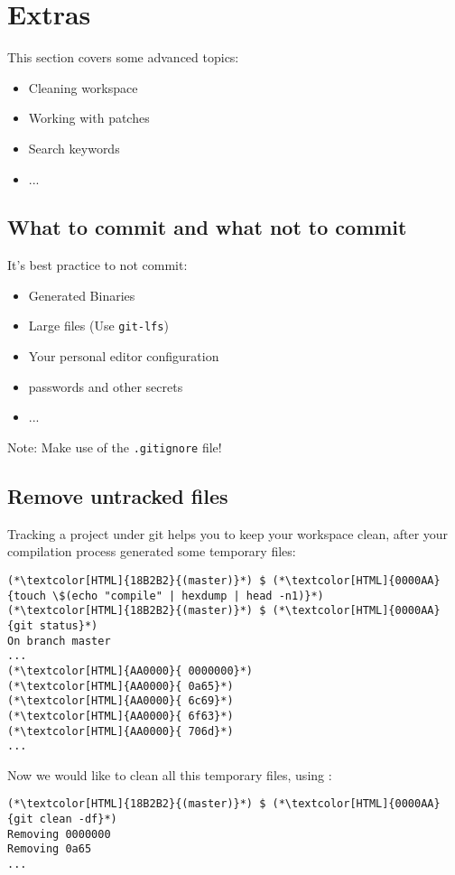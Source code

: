 \section{Extras}
\begin{frame}[fragile]
  \slidetitle
  This section covers some advanced topics:
  \begin{itemize}
    \item Cleaning workspace
    \item Working with patches
    \item Search keywords
    \item ...
  \end{itemize}
\end{frame}

\subsection{What to commit and what not to commit}
\begin{frame}[fragile]
  \slidetitle
  It's best practice to not commit:
  \begin{itemize}
    \item Generated Binaries
    \item Large files (Use \lstinline{git-lfs})
    \item Your personal editor configuration
    \item passwords and other secrets
    \item ...
  \end{itemize}

  Note: Make use of the \lstinline{.gitignore} file!

\end{frame}

\subsection{Remove untracked files}
\begin{frame}[fragile]
    \subslidetitle
  Tracking a project under git helps you to keep your workspace clean, after your compilation process generated some temporary files:

  \begin{lstlisting}
(*\textcolor[HTML]{18B2B2}{(master)}*) $ (*\textcolor[HTML]{0000AA}{touch \$(echo "compile" | hexdump | head -n1)}*)
(*\textcolor[HTML]{18B2B2}{(master)}*) $ (*\textcolor[HTML]{0000AA}{git status}*)
On branch master
...
(*\textcolor[HTML]{AA0000}{	0000000}*)
(*\textcolor[HTML]{AA0000}{	0a65}*)
(*\textcolor[HTML]{AA0000}{	6c69}*)
(*\textcolor[HTML]{AA0000}{	6f63}*)
(*\textcolor[HTML]{AA0000}{	706d}*)
...
\end{lstlisting}
  Now we would like to clean all this temporary files, using :
  \begin{lstlisting}
(*\textcolor[HTML]{18B2B2}{(master)}*) $ (*\textcolor[HTML]{0000AA}{git clean -df}*)
Removing 0000000
Removing 0a65
...
\end{lstlisting}

\end{frame}

